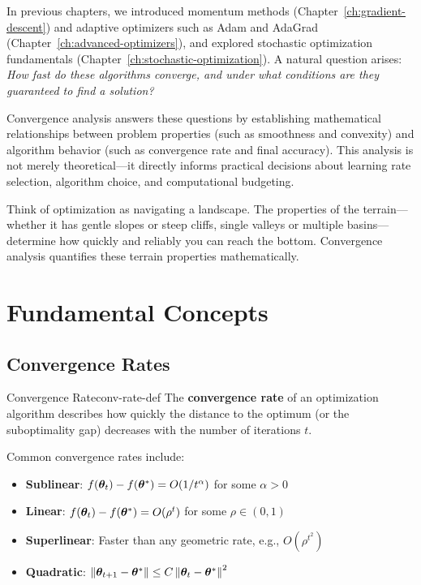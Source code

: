 \documentclass[../../main.tex]{subfiles}
\begin{document}
In previous chapters, we introduced momentum methods (Chapter~\ref{ch:gradient-descent}) and adaptive optimizers such as Adam and AdaGrad (Chapter~\ref{ch:advanced-optimizers}), and explored stochastic optimization fundamentals (Chapter~\ref{ch:stochastic-optimization}). A natural question arises: \textit{How fast do these algorithms converge, and under what conditions are they guaranteed to find a solution?}

Convergence analysis answers these questions by establishing mathematical relationships between problem properties (such as smoothness and convexity) and algorithm behavior (such as convergence rate and final accuracy). This analysis is not merely theoretical---it directly informs practical decisions about learning rate selection, algorithm choice, and computational budgeting.

\begin{intuition}
Think of optimization as navigating a landscape. The properties of the terrain---whether it has gentle slopes or steep cliffs, single valleys or multiple basins---determine how quickly and reliably you can reach the bottom. Convergence analysis quantifies these terrain properties mathematically.
\end{intuition}

\section{Fundamental Concepts}
\label{sec:conv-fundamentals}

\subsection{Convergence Rates}

\begin{definition}{Convergence Rate}{conv-rate-def}
The \textbf{convergence rate} of an optimization algorithm describes how quickly the distance to the optimum (or the suboptimality gap) decreases with the number of iterations $t$.

Common convergence rates include:
\begin{itemize}
    \item \textbf{Sublinear}: $f(\boldsymbol{\theta}_t) - f(\boldsymbol{\theta}^*) = O(1/t^\alpha)$ for some $\alpha > 0$
    \item \textbf{Linear}: $f(\boldsymbol{\theta}_t) - f(\boldsymbol{\theta}^*) = O(\rho^t)$ for some $\rho \in (0, 1)$
    \item \textbf{Superlinear}: Faster than any geometric rate, e.g., $O(\rho^{t^2})$
    \item \textbf{Quadratic}: $\left\lVert \boldsymbol{\theta}_{t+1} - \boldsymbol{\theta}^* \right\rVert \leq C \left\lVert \boldsymbol{\theta}_t - \boldsymbol{\theta}^* \right\rVert^2$
\end{itemize}
\end{definition}
\end{document}
